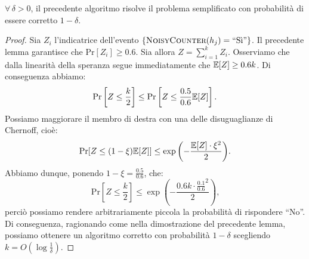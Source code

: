 \begin{lemma}
  \(\forall\,\delta>0\), il precedente algoritmo risolve il problema semplificato
  con probabilit\`a di essere corretto \(1-\delta\).
\end{lemma}
\begin{proof}
  Sia \(Z_i\) l'indicatrice dell'evento \(\{\textsc{NoisyCounter}(h_j)=\mbox{``S\`i''}\}\).
  Il precedente lemma garantisce che \(\mbox{Pr}[Z_i]\ge 0.6\). Sia allora \(Z=
  \sum_{i=1}^k{Z_i}\). Osserviamo che dalla linearit\`a della speranza segue 
  immediatamente che \(\mathbb{E}[Z]\ge 0.6k\). Di conseguenza abbiamo:
  \[\mbox{Pr}\left[Z\le\frac{k}{2}\right]\le\mbox{Pr}\left[Z\le\frac{0.5}{0.6}
  \mathbb{E}[Z]\right]\mbox{.}\]
  Possiamo maggiorare il membro di destra con una delle disuguaglianze di
  Chernoff, cio\`e:
  \[\mbox{Pr}[Z\le(1-\xi)\mathbb{E}[Z]]\le\exp{\left(-\frac{\mathbb{E}[Z]\cdot\xi^2}{2}\right)}\mbox{.}\]
  Abbiamo dunque, ponendo \(1-\xi = \frac{0.5}{0.6}\), che:
  \[\mbox{Pr}\left[Z\le\frac{k}{2}\right]\le\exp{\left(-\frac{0.6 k\cdot{\frac{0.1}{0.6}}^2}{2}\right)}\mbox{,}\]
  perci\`o possiamo rendere arbitrariamente  piccola la probabilit\`a di rispondere
  ``No''. Di conseguenza, ragionando come nella dimostrazione del precedente lemma,
  possiamo ottenere un algoritmo corretto con probabilit\`a \(1-\delta\) scegliendo
  \(k = O\left(\log{\frac{1}{\delta}}\right)\).
\end{proof}

